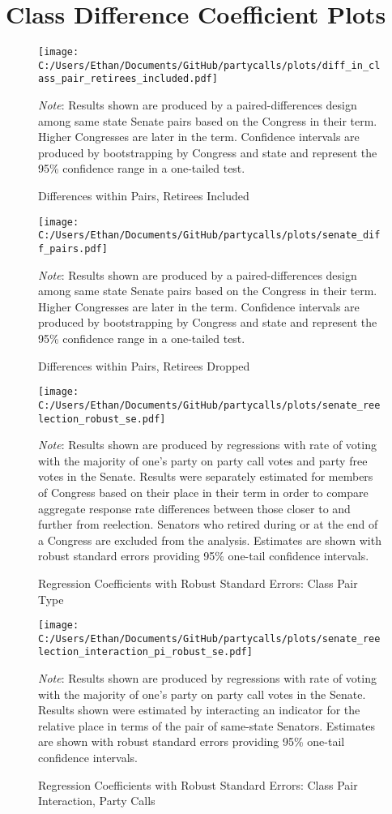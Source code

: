 \documentclass[12pt]{article}
\newcommand\fnote[1]{\captionsetup{font=small}\caption*{#1}}
\begin{document}
\section{Class Difference Coefficient Plots}

\begin{figure}[H]
	\centering
	\caption{Differences within Pairs, Retirees Included}
	\texttt{[image: C:/Users/Ethan/Documents/GitHub/partycalls/plots/diff\_in\_class\_pair\_retirees\_included.pdf]}
	\fnote{\textit{Note}: Results shown are produced by a paired-differences design among same state Senate pairs based on the Congress in their term. Higher Congresses are later in the term. Confidence intervals are produced by bootstrapping by Congress and state and represent the 95\% confidence range in a one-tailed test.}
\end{figure} 

\begin{figure}[H]
	\centering
	\caption{Differences within Pairs, Retirees Dropped}
	\texttt{[image: C:/Users/Ethan/Documents/GitHub/partycalls/plots/senate\_diff\_pairs.pdf]}
	\fnote{\textit{Note}: Results shown are produced by a paired-differences design among same state Senate pairs based on the Congress in their term. Higher Congresses are later in the term. Confidence intervals are produced by bootstrapping by Congress and state and represent the 95\% confidence range in a one-tailed test.}
\end{figure} 

\begin{figure}[H]
	\centering
	\caption{Regression Coefficients with Robust Standard Errors: Class Pair Type}
	\texttt{[image: C:/Users/Ethan/Documents/GitHub/partycalls/plots/senate\_reelection\_robust\_se.pdf]}
	\fnote{\textit{Note}: Results shown are produced by regressions with rate of voting with the majority of one's party on party call votes and party free votes in the Senate. Results were separately estimated for members of Congress based on their place in their term in order to compare aggregate response rate differences between those closer to and further from reelection. Senators who retired during or at the end of a Congress are excluded from the analysis. Estimates are shown with robust standard errors providing 95\% one-tail confidence intervals.}
\end{figure}

\begin{figure}[H]
	\centering
	\caption{Regression Coefficients with Robust Standard Errors: Class Pair Interaction, Party Calls}
	\texttt{[image: C:/Users/Ethan/Documents/GitHub/partycalls/plots/senate\_reelection\_interaction\_pi\_robust\_se.pdf]}
	\fnote{\textit{Note}: Results shown are produced by regressions with rate of voting with the majority of one's party on party call votes in the Senate. Results shown were estimated by interacting an indicator for the relative place in terms of the pair of same-state Senators. Estimates are shown with robust standard errors providing 95\% one-tail confidence intervals.}
\end{figure}
\end{document}
